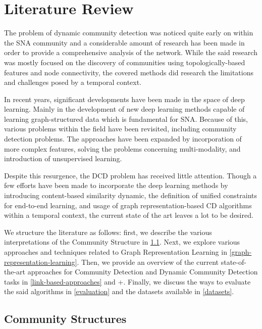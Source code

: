 \documentclass[
acmsmall,
nonacm,
screen,
acmthm]{../../scripts/pandoc/templates/acmart}
\begin{document}
\hypertarget{literature-review}{%
\section{Literature Review}\label{literature-review}}

The problem of dynamic community detection was noticed quite early on
within the SNA community and a considerable amount of research has been
made in order to provide a comprehensive analysis of the network. While
the said research was mostly focused on the discovery of communities
using topologically-based features and node connectivity, the covered
methods did research the limitations and challenges posed by a temporal
context.

In recent years, significant developments have been made in the space of
deep learning. Mainly in the development of new deep learning methods
capable of learning graph-structured data
\citep{bronsteinGeometricDeepLearning2017, hamiltonRepresentationLearningGraphs2018, kipfSemiSupervisedClassificationGraph2017}
which is fundamental for SNA. Because of this, various problems within
the field have been revisited, including community detection problems.
The approaches have been expanded by incorporation of more complex
features, solving the problems concerning multi-modality, and
introduction of unsupervised learning.

Despite this resurgence, the DCD problem has received little attention.
Though a few efforts have been made to incorporate the deep learning
methods by introducing content-based similarity dynamic, the definition
of unified constraints for end-to-end learning, and usage of graph
representation-based CD algorithms within a temporal context, the
current state of the art leaves a lot to be desired.

We structure the literature as follows: first, we describe the various
interpretations of the Community Structure in
\cref{community-structures}. Next, we explore various approaches and
techniques related to Graph Representation Learning in
\cref{graph-representation-learning}. Then, we provide an overview of
the current state-of-the-art approaches for Community Detection and
Dynamic Community Detection tasks in \cref{link-based-approaches} and
+\citet{repesentation-based-approaches}. Finally, we discuss the ways to
evaluate the said algorithms in \cref{evaluation} and the datasets
available in \cref{datasets}.

\hypertarget{community-structures}{%
\subsection{Community Structures}\label{community-structures}}
\end{document}
